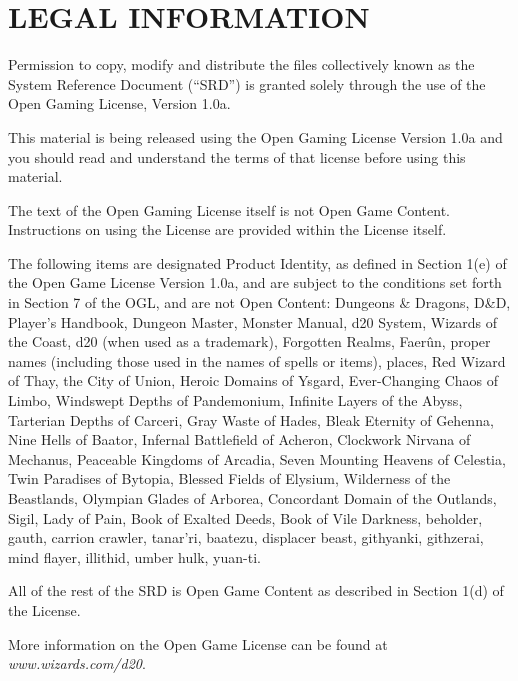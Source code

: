 \documentclass{article}
\begin{document}
\section*{{\LARGE{}LEGAL INFORMATION}}

\vspace{12pt}
Permission to copy, modify and distribute the files collectively known as the System 
Reference Document (``SRD'') is granted solely through the use of the Open Gaming 
License, Version 1.0a. 

\vspace{12pt}
This material is being released using the Open Gaming License Version 1.0a and 
you should read and understand the terms of that license before using this material. 

\vspace{12pt}
The text of the Open Gaming License itself is not Open Game Content. Instructions 
on using the License are provided within the License itself. 

\vspace{12pt}
The following items are designated Product Identity, as defined in Section 1(e) 
of the Open Game License Version 1.0a, and are subject to the conditions set forth 
in Section 7 of the OGL, and are not Open Content: Dungeons \& Dragons, D\&D, Player's 
Handbook, Dungeon Master, Monster Manual, d20 System, Wizards of the Coast, d20 
(when used as a trademark), Forgotten Realms, Faerûn, proper names (including 
those used in the names of spells or items), places, Red Wizard of Thay, the City 
of Union, Heroic Domains of Ysgard, Ever-Changing Chaos of Limbo, Windswept Depths 
of Pandemonium, Infinite Layers of the Abyss, Tarterian Depths of Carceri, Gray 
Waste of Hades, Bleak Eternity of Gehenna, Nine Hells of Baator, Infernal Battlefield 
of Acheron, Clockwork Nirvana of Mechanus, Peaceable Kingdoms of Arcadia, Seven 
Mounting Heavens of Celestia, Twin Paradises of Bytopia, Blessed Fields of Elysium, 
Wilderness of the Beastlands, Olympian Glades of Arborea, Concordant Domain of 
the Outlands, Sigil, Lady of Pain, Book of Exalted Deeds, Book of Vile Darkness, 
beholder, gauth, carrion crawler, tanar'ri, baatezu, displacer beast, githyanki, 
githzerai, mind flayer, illithid, umber hulk, yuan-ti.

\vspace{12pt}
All of the rest of the SRD is Open Game Content as described in Section 1(d) of 
the License. 

\vspace{12pt}
More information on the Open Game License can be found at {\color{color02} \emph{www.wizards.com/d20}}.
\end{document}
